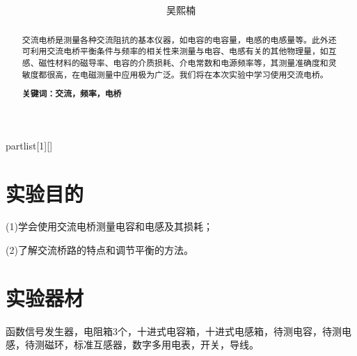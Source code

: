 \documentclass[UTF8]{ctexart}
\author{
	吴熙楠}
\title{
	\heiti{交流电桥实验}
}
\begin{document}
	\maketitle
	\newtheorem{definition}{定义}[subsection]
	\newtheorem{function}{公式}[subsection]
	\newtheorem{summary}{小结}[subsection]
	\newtheorem{deduction}{推论}[subsection]
	\newtheorem{property}{性质}[subsection]
	\newtheorem{theo}{定理}[subsection]
	\newtheorem{step}{步骤}[subsection]
	\newtheorem{remark}{注记}[subsection]
	\newtheorem{proof}{证明}[subsection]
	\newenvironment{Theorem}[1][]{\par\noindent\textbf{定理}(#1)\quad}{\par}
	\newcommand{\rbra}[1]{\left( #1 \right)}
	\newcommand{\sbra}[1]{\left[ #1 \right]}
	\newcommand{\cbra}[1]{\left\{ #1 \right\}}
	\newcommand{\pbra}[1]{\left< #1 \right>}
	\newcommand{\abs}[1]{\left| #1 \right|}
	\newcommand{\fs}[2]{\displaystyle\frac{#1}{#2}}
	
	\newenvironment{myproof}{{\color{blue}证：}}
	
	\newenvironment{partlist}[1][]
	{\begin{enumerate}[itemsep=0pt, label=(\arabic*), wide, labelindent=\parindent, listparindent=\parindent, #1]}
		{\end{enumerate}}
	
	\renewcommand{\contentsname}{目录} %
	\tableofcontents
	\newpage
	\renewcommand{\abstractname}{\large 摘要\\}
	\begin{abstract}
		交流电桥是测量各种交流阻抗的基本仪器，如电容的电容量，电感的电感量等。此外还可利用交流电桥平衡条件与频率的相关性来测量与电容、电感有关的其他物理量，如互感、磁性材料的磁导率、电容的介质损耗、介电常数和电源频率等，其测量准确度和灵敏度都很高，在电磁测量中应用极为广泛。我们将在本次实验中学习使用交流电桥。
		
		\textbf{关键词：交流，频率，电桥}
	\end{abstract}
	\section{实验目的}
	(1)学会使用交流电桥测量电容和电感及其损耗；
	\par (2)了解交流桥路的特点和调节平衡的方法。
	\section{实验器材}
	函数信号发生器，电阻箱3个，十进式电容箱，十进式电感箱，待测电容，待测电感，待测磁环，标准互感器，数字多用电表，开关，导线。
\end{document}
